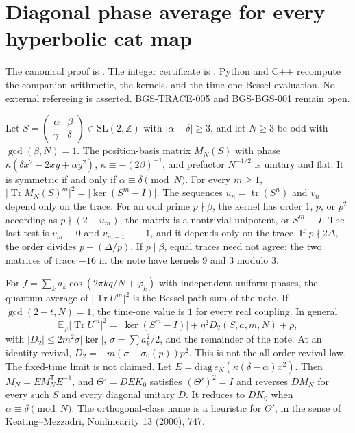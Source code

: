 \section{Diagonal phase average for every hyperbolic cat map}
\label{sec:hyperbolic-diagonal-form-factor}
The canonical proof is
.
The integer certificate is
.
Python and C++ recompute the companion arithmetic, the kernels, and the time-one Bessel evaluation.
No external refereeing is asserted.
BGS-TRACE-005 and BGS-BGS-001 remain open.


\begin{theorem}
\label{thm:hyperbolic-diagonal-form-factor}
Let \(S=\begin{pmatrix}\alpha&\beta\\\gamma&\delta\end{pmatrix}\in\mathrm{SL}(2,\mathbb Z)\)
with \(|\alpha+\delta|\ge 3\), and let \(N\ge 3\) be odd with \(\gcd(\beta,N)=1\).
The position-basis matrix \(M_N(S)\) with phase
\(\kappa(\delta x^2-2xy+\alpha y^2)\), \(\kappa\equiv-(2\beta)^{-1}\),
and prefactor \(N^{-1/2}\) is unitary and flat. It is symmetric if and only if
\(\alpha\equiv\delta\pmod N\). For every \(m\ge 1\),
\(\lvert\operatorname{Tr} M_N(S)^m\rvert^2=\lvert\ker(S^m-I)\rvert\).
The sequences \(u_n=\operatorname{tr}(S^n)\) and \(v_n\) depend only on the trace.
For an odd prime \(p\nmid\beta\), the kernel has order \(1\), \(p\), or \(p^2\)
according as \(p\nmid(2-u_m)\), the matrix is a nontrivial unipotent, or
\(S^m\equiv I\). The last test is \(v_m\equiv 0\) and \(v_{m-1}\equiv-1\), and
it depends only on the trace. If \(p\nmid 2\Delta\), the order divides
\(p-(\Delta/p)\). If \(p\mid\beta\), equal traces need not agree: the two
matrices of trace \(-16\) in the note have kernels \(9\) and \(3\) modulo \(3\).

For \(f=\sum_k a_k\cos(2\pi k q/N+\varphi_k)\) with independent uniform phases,
the quantum average of \(\lvert\operatorname{Tr} U^m\rvert^2\) is the Bessel
path sum of the note. If \(\gcd(2-t,N)=1\), the time-one value is \(1\) for
every real coupling. In general
\[
\mathbb E_\varphi\lvert\operatorname{Tr} U^m\rvert^2
=\lvert\ker(S^m-I)\rvert+\eta^2 D_2(S,a,m,N)+\rho,
\]
with \(\lvert D_2\rvert\le 2m^2\sigma\lvert\ker\rvert\),
\(\sigma=\sum a_k^2/2\), and the remainder of the note.
At an identity revival, \(D_2=-m(\sigma-\sigma_0(p))p^2\). This is not the
all-order revival law. The fixed-time limit is not claimed.
Let \(E=\mathrm{diag}\,e_N(\kappa(\delta-\alpha)x^2)\). Then \(M_N=EM_N^{\mathsf T}E^{-1}\),
and \(\Theta'=DEK_0\) satisfies \((\Theta')^2=I\) and reverses \(DM_N\) for every such
\(S\) and every diagonal unitary \(D\). It reduces to \(DK_0\) when
\(\alpha\equiv\delta\pmod N\). The orthogonal-class name is a heuristic for
\(\Theta'\), in the sense of Keating--Mezzadri, Nonlinearity 13 (2000), 747.
\end{theorem}

